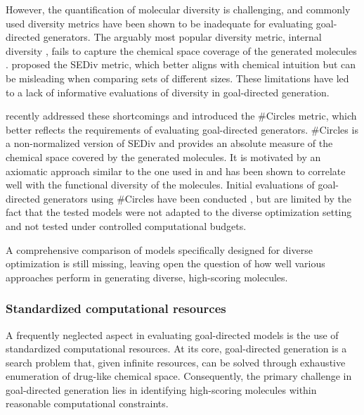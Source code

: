 However, the quantification of molecular diversity is challenging, and commonly used diversity
metrics have been shown to be inadequate for evaluating goal-directed generators. The
arguably most popular diversity metric, internal diversity
\citep{benhendaChemGANChallengeDrug2017}, fails to capture the chemical space coverage
of the generated molecules
\citep{waldmanNovelAlgorithmsOptimization2000,xieHowMuchSpace2023,thomasComparisonStructureLigandbased2021}.
\citet{thomasComparisonStructureLigandbased2021} proposed the \ac{SEDiv} metric, which better aligns
with chemical intuition but can be misleading when comparing sets of different sizes. These
limitations have led to a lack of informative evaluations of diversity in goal-directed generation.

\citet{xieHowMuchSpace2023} recently addressed these shortcomings and introduced the \#Circles
metric, which better reflects the requirements of evaluating goal-directed generators. \#Circles is
a non-normalized version of \ac{SEDiv} and provides an absolute measure of the chemical space
covered by the generated molecules. It is motivated by an axiomatic approach similar to the one used
in \citep{waldmanNovelAlgorithmsOptimization2000} and has been shown to correlate well with the
functional diversity of the molecules. Initial evaluations of goal-directed generators
using \#Circles have been conducted \citep{xieHowMuchSpace2023}, but are limited by the fact that the tested models were not
adapted to the diverse optimization setting and not tested under controlled computational budgets.

A comprehensive comparison of models specifically designed for diverse optimization is still
missing, leaving open the question of how well various approaches perform in generating diverse,
high-scoring molecules.

\subsubsection{Standardized computational resources}
A frequently neglected aspect in evaluating goal-directed models is the use of standardized
computational resources. At its core, goal-directed generation is a search problem
that, given infinite resources, can be solved through exhaustive enumeration of drug-like chemical space.
Consequently, the primary challenge in goal-directed generation lies in identifying high-scoring molecules
within reasonable computational constraints.

